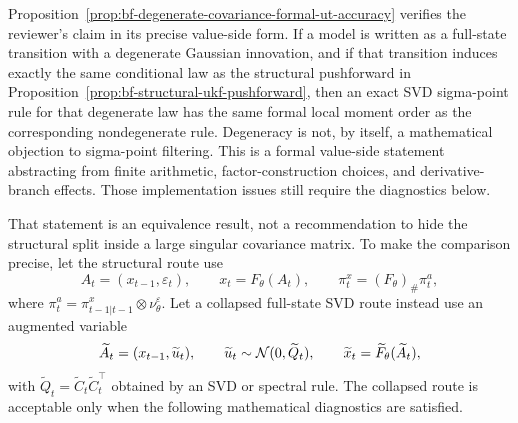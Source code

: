 Proposition~\ref{prop:bf-degenerate-covariance-formal-ut-accuracy} verifies
the reviewer's claim in its precise value-side form.  If a model is written as
a full-state transition with a degenerate Gaussian innovation, and if that
transition induces exactly the same conditional law as the structural
pushforward in Proposition~\ref{prop:bf-structural-ukf-pushforward}, then an
exact SVD sigma-point rule for that degenerate law has the same formal local
moment order as the corresponding nondegenerate rule.  Degeneracy is not, by
itself, a mathematical objection to sigma-point filtering.
This is a formal value-side statement abstracting from finite arithmetic,
factor-construction choices, and derivative-branch effects.  Those
implementation issues still require the diagnostics below.

That statement is an equivalence result, not a recommendation to hide the
structural split inside a large singular covariance matrix.  To make the
comparison precise, let the structural route use
\[
  A_t=(x_{t-1},\varepsilon_t),\qquad
  x_t=F_\theta(A_t),\qquad
  \pi_t^x=(F_\theta)_\#\pi_t^a ,
\]
where $\pi_t^a=\pi_{t-1|t-1}^x\otimes\nu_\theta^\varepsilon$.  Let a collapsed
full-state SVD route instead use an augmented variable
\[
  \widetilde A_t=(x_{t-1},\widetilde u_t),\qquad
  \widetilde u_t\sim\mathcal{N}(0,\widetilde Q_t),\qquad
  \widetilde x_t=\widetilde F_\theta(\widetilde A_t),
\]
with $\widetilde Q_t=\widetilde C_t\widetilde C_t^\top$ obtained by an SVD or
spectral rule.  The collapsed route is acceptable only when the following
mathematical diagnostics are satisfied.


